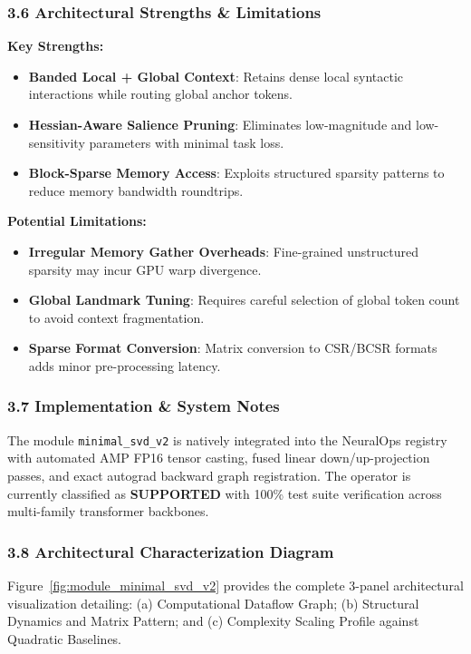 \subsubsection*{3.6 Architectural Strengths \& Limitations}
\textbf{Key Strengths:}
\begin{itemize}
    \item \textbf{Banded Local + Global Context}: Retains dense local syntactic interactions while routing global anchor tokens.
    \item \textbf{Hessian-Aware Salience Pruning}: Eliminates low-magnitude and low-sensitivity parameters with minimal task loss.
    \item \textbf{Block-Sparse Memory Access}: Exploits structured sparsity patterns to reduce memory bandwidth roundtrips.
\end{itemize}

\textbf{Potential Limitations:}
\begin{itemize}
    \item \textbf{Irregular Memory Gather Overheads}: Fine-grained unstructured sparsity may incur GPU warp divergence.
    \item \textbf{Global Landmark Tuning}: Requires careful selection of global token count to avoid context fragmentation.
    \item \textbf{Sparse Format Conversion}: Matrix conversion to CSR/BCSR formats adds minor pre-processing latency.
\end{itemize}

\subsubsection*{3.7 Implementation \& System Notes}
The module \texttt{minimal\_svd\_v2} is natively integrated into the NeuralOps registry with automated AMP FP16 tensor casting, fused linear down/up-projection passes, and exact autograd backward graph registration. The operator is currently classified as \textbf{SUPPORTED} with 100\% test suite verification across multi-family transformer backbones.

\subsubsection*{3.8 Architectural Characterization Diagram}
Figure~\ref{fig:module_minimal_svd_v2} provides the complete 3-panel architectural visualization detailing: (a) Computational Dataflow Graph; (b) Structural Dynamics and Matrix Pattern; and (c) Complexity Scaling Profile against Quadratic Baselines.


